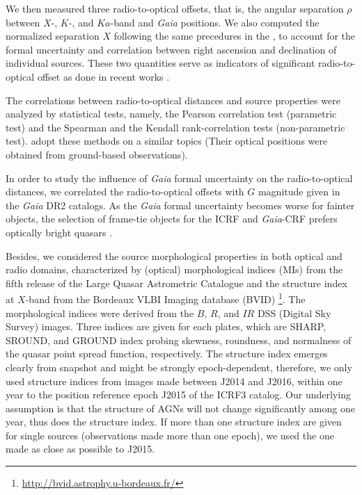\documentclass{aa}
\begin{document}
   We then measured three radio-to-optical offsets, that is, the angular separation $\rho$ between $X$-, $K$-, and $Ka$-band and \textit{Gaia} positions.
   We also computed the normalized separation $X$ following the same precedures in the \citet[][their X-statistics]{2016A&A...595A...5M},
   to account for the formal uncertainty and correlation between right ascension and declination of individual sources.
   These two quantities serve as indicators of significant radio-to-optical offset as done in recent works \citep[e.g.,][]{2019MNRAS.482.3023P,2018A&A...616A..14G}.

   The correlations between radio-to-optical distances and source properties were analyzed by statistical tests, namely, the Pearson correlation test (parametric test) and the Spearman and the Kendall rank-correlation tests (non-parametric test).
   \citet{2013MNRAS.430.2797A} adopt these methods on a similar topics (Their optical positions were obtained from ground-based observations).

   In order to study the influence of \textit{Gaia} formal uncertainty on the radio-to-optical distances, we correlated the radio-to-optical offsets with $G$ magnitude given in the {\it Gaia} DR2 catalogs.
   As the \textit{Gaia} formal uncertainty becomes worse for fainter objects, the selection of frame-tie objects for the ICRF and \textit{Gaia}-CRF prefers optically bright quasars \citep[visual magnitude $V<17$, see, e.g.,][]{2008A&A...490..403B}.

   Besides, we considered the source morphological properties in both optical and radio domains, characterized by (optical) morphological indices (MIs) from the fifth release of the Large Quasar Astrometric Catalogue \citep[LQAC-5;][]{2019A&A...624A.145S} and the structure index \citep[SI;][]{1997ApJS..111...95F} at $X$-band from the Bordeaux VLBI Imaging database (BVID) \footnote{\url{http://bvid.astrophy.u-bordeaux.fr/}}.
   The morphological indices were derived from the $B$, $R$,  and $IR$  DSS (Digital Sky Survey) images.
   Three indices are given for each plates, which are SHARP, SROUND, and GROUND index probing skewness, roundness, and normalness of the quasar point spread function, respectively.
   The structure index emerges clearly from snapshot and might be strongly epoch-dependent, therefore, we only used structure indices from images made between J2014 and J2016, within one year to the position reference epoch J2015 of the ICRF3 catalog.
   Our underlying assumption is that the structure of AGNs will not change significantly among one year, thus does the structure index.
   If more than one structure index are given for single sources (observations made more than one epoch), we used the one made as close as possible to J2015.
\end{document}
